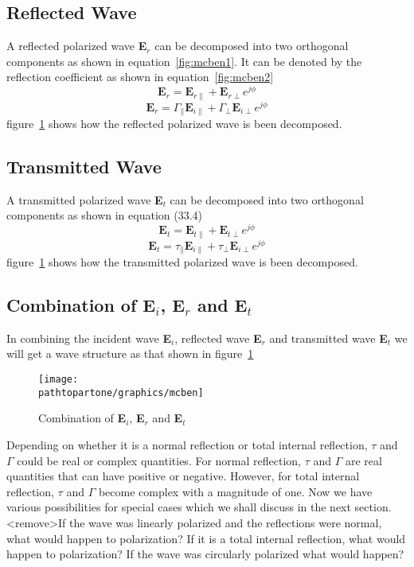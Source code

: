 \subsection{Reflected Wave}
A reflected polarized wave \textbf{E$_r$} can be decomposed into two orthogonal components as shown in equation~\ref{fig:mcben1}. It can be denoted by the reflection coefficient as shown in equation~\ref{fig:mcben2}
\begin{equation}
\textbf{E}_r = \textbf{E}_{r\parallel} + \textbf{E}_{r\perp} e^{j\phi}
\end{equation}	
\begin{equation}
\textbf{E}_r = \Gamma_\parallel \textbf{E}_{i\parallel} + \Gamma_\perp \textbf{E}_{i\perp} e^{j\phi}
\end{equation}	
figure~\ref{fig:mcben} shows how the reflected polarized wave is been decomposed.

\subsection{Transmitted Wave}
A transmitted polarized wave \textbf{E$_t$} can be decomposed into two orthogonal components as shown in equation (33.4)	
\begin{equation}
\textbf{E}_t = \textbf{E}_{t\parallel} + \textbf{E}_{t\perp} e^{j\phi}
\end{equation}	
\begin{equation}
\textbf{E}_t = \tau_\parallel \textbf{E}_{i\parallel} + \tau_\perp\textbf{E}_{i\perp} e^{j\phi}
\end{equation}	
figure~\ref{fig:mcben} shows how the transmitted polarized wave is been decomposed.	

\subsection{Combination of \textbf{E$_i$}, \textbf{E$_r$} and \textbf{E$_t$}}
In combining the incident wave \textbf{E$_i$}, reflected wave \textbf{E$_r$} and transmitted wave \textbf{E$_t$} we will get a wave structure as that shown in figure~\ref{fig:mcben}	
\begin{figure}[h]
\centering
\texttt{[image: \\pathtopartone/graphics/mcben]}
\caption{Combination of \textbf{E$_i$}, \textbf{E$_r$} and \textbf{E$_t$}}
\label{fig:mcben}
\end{figure}

Depending on whether it is a normal reflection or total internal reflection, $\tau$ and $\Gamma$ could be real or complex quantities. For normal reflection, $\tau$ and $\Gamma$ are real quantities that can have positive or negative. However, for total internal reflection, $\tau$ and $\Gamma$ become complex with a magnitude of one. Now we have various possibilities for special cases which we shall discuss in the next section. <remove>If the wave was linearly polarized and the reflections were normal, what would happen to polarization? If it is a total internal reflection, what would happen to polarization? If the wave was circularly polarized what would happen?

